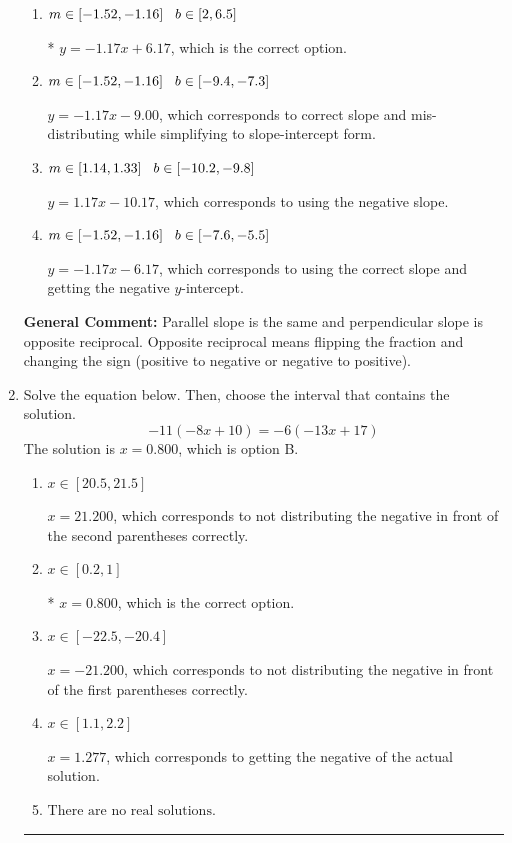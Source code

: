 \documentclass{extbook}[14pt]
\newcommand{\litem}[1]{\item #1

\rule{\textwidth}{0.4pt}}
\begin{document}
\begin{enumerate}
{\begin{enumerate}[label=\Alph*.]
 $y = -0.86x + 6.17$, which corresponds to using the reciprocal slope $(1/m)$.
\item \( m \in [-1.52, -1.16] \hspace*{3mm} b \in [2, 6.5] \)

* $y = -1.17x + 6.17$, which is the correct option.
\item \( m \in [-1.52, -1.16] \hspace*{3mm} b \in [-9.4, -7.3] \)

 $y = -1.17x - 9.00$, which corresponds to correct slope and mis-distributing while simplifying to slope-intercept form.
\item \( m \in [1.14, 1.33] \hspace*{3mm} b \in [-10.2, -9.8] \)

 $y = 1.17x - 10.17$, which corresponds to using the negative slope.
\item \( m \in [-1.52, -1.16] \hspace*{3mm} b \in [-7.6, -5.5] \)

 $y = -1.17x - 6.17$, which corresponds to using the correct slope and getting the negative $y$-intercept.
\end{enumerate}

\textbf{General Comment:} Parallel slope is the same and perpendicular slope is opposite reciprocal. Opposite reciprocal means flipping the fraction and changing the sign (positive to negative or negative to positive).
}
\litem{
Solve the equation below. Then, choose the interval that contains the solution.
\[ -11(-8x + 10) = -6(-13x + 17) \]The solution is \( x = 0.800 \), which is option B.\begin{enumerate}[label=\Alph*.]
\item \( x \in [20.5, 21.5] \)

$x = 21.200$, which corresponds to not distributing the negative in front of the second parentheses correctly.
\item \( x \in [0.2, 1] \)

* $x = 0.800$, which is the correct option.
\item \( x \in [-22.5, -20.4] \)

$x = -21.200$, which corresponds to not distributing the negative in front of the first parentheses correctly.
\item \( x \in [1.1, 2.2] \)

$x = 1.277$, which corresponds to getting the negative of the actual solution.
\item \( \text{There are no real solutions.} \)


\end{enumerate}}
\end{enumerate}
\end{document}
